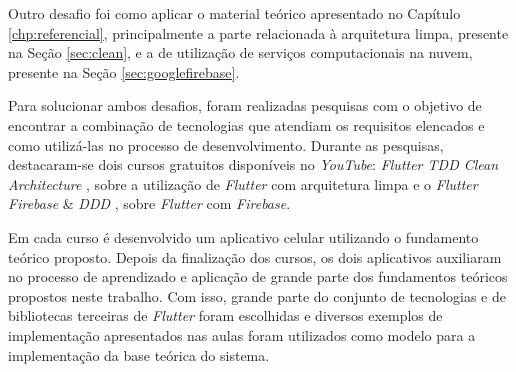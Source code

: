 Outro desafio foi como aplicar o material teórico apresentado no Capítulo \ref{chp:referencial}, principalmente a parte relacionada à arquitetura limpa, presente na Seção \ref{sec:clean}, e a de utilização de serviços computacionais na nuvem, presente na Seção \ref{sec:googlefirebase}.

Para solucionar ambos desafios, foram realizadas pesquisas com o objetivo de encontrar a combinação de tecnologias que atendiam os requisitos elencados e como utilizá-las no processo de desenvolvimento. Durante as pesquisas, destacaram-se dois cursos gratuitos disponíveis no \textit{YouTube}: \textit{Flutter TDD Clean Architecture} \cite{resocoderclean}, sobre a utilização de \textit{Flutter} com arquitetura limpa e o \textit{Flutter Firebase} \& \textit{DDD} \cite{resocoderfirebase}, sobre \textit{Flutter} com \textit{Firebase}.

Em cada curso é desenvolvido um aplicativo celular utilizando o fundamento teórico proposto. Depois da finalização dos cursos, os dois aplicativos auxiliaram no processo de aprendizado e aplicação de grande parte dos fundamentos teóricos propostos neste trabalho. Com isso, grande parte do conjunto de tecnologias e de bibliotecas terceiras de \textit{Flutter} foram escolhidas e diversos exemplos de implementação apresentados nas aulas foram utilizados como modelo para a implementação da base teórica do sistema.

